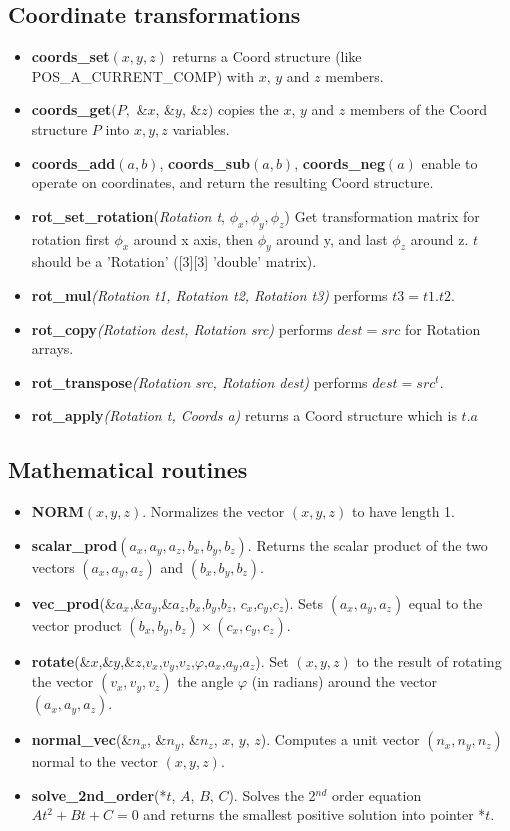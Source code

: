 \subsection{Coordinate transformations}
\begin{itemize}
\item {\bf coords\_set}$(x,y,z)$ returns a Coord structure (like POS\_A\_CURRENT\_COMP) with $x$, $y$ and $z$ members.
\item {\bf  coords\_get}$(P,$ \&$x$, \&$y$, \&$z)$ copies the $x$, $y$ and
$z$ members of the Coord structure $P$ into $x,y,z$ variables.
\item {\bf coords\_add}$(a,b)$, {\bf coords\_sub}$(a,b)$, {\bf
coords\_neg}$(a)$ enable to  operate on coordinates, and return the
resulting Coord structure.
\item {\bf rot\_set\_rotation}({\it Rotation t}, $\phi_x, \phi_y, \phi_z$)
  Get transformation matrix for rotation
  first $\phi_x$ around x axis, then $\phi_y$ around y,
  and last $\phi_z$ around z. $t$ should be a 'Rotation' ([3][3] 'double' matrix).
\item {\bf rot\_mul}{\it (Rotation t1, Rotation t2, Rotation t3)} performs $t3 = t1 . t2$.
\item {\bf rot\_copy}{\it (Rotation dest, Rotation src)} performs $dest = src$ for Rotation arrays.
\item {\bf rot\_transpose}{\it (Rotation src, Rotation dest)} performs $dest = src^t$.
\item {\bf rot\_apply}{\it (Rotation t, Coords a)} returns a Coord structure which is $t.a$
\end{itemize}

\subsection{Mathematical routines}
\begin{itemize}
\item {\bf NORM}$(x,y,z)$. Normalizes the vector $(x,y,z)$ to have
  length 1.
\item {\bf scalar\_prod}$(a_x,a_y,a_z,b_x,b_y,b_z)$. Returns the scalar
  product of the two vectors $(a_x,a_y,a_z)$ and $(b_x,b_y,b_z)$.
\item {\bf vec\_prod}(\&$a_x$,\&$a_y$,\&$a_z$,$b_x$,$b_y$,$b_z$, $c_x$,$c_y$,$c_z$). Sets
  $(a_x,a_y,a_z)$ equal to the vector product $(b_x,b_y,b_z) \times (c_x,c_y,c_z)$.
\item {\bf rotate}(\&$x$,\&$y$,\&$z$,$v_x$,$v_y$,$v_z$,$\varphi$,$a_x$,$a_y$,$a_z$). Set
  $(x,y,z)$ to the result of rotating the vector $(v_x,v_y,v_z)$
  the angle $\varphi$ (in radians) around the vector $(a_x,a_y,a_z)$.
\item {\bf normal\_vec}(\&$n_x$, \&$n_y$, \&$n_z$, $x$, $y$, $z$).
  Computes a unit vector $(n_x, n_y, n_z)$ normal to the vector
  $(x,y,z)$.
\item {\bf solve\_2nd\_order}(*$t$, $A$,  $B$,  $C$).
  Solves the 2$^{nd}$ order equation $At^2 + Bt + C = 0$ and returns
  the smallest positive solution into pointer *$t$.
\end{itemize}

